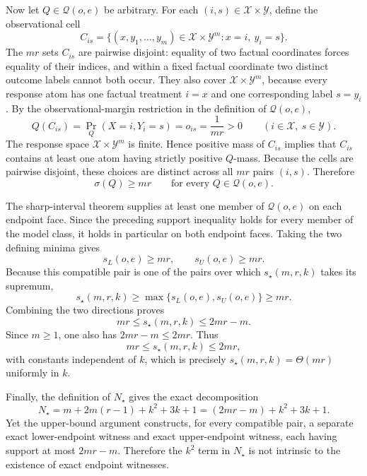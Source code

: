 Now let \(Q\in\mathcal Q(o,e)\) be arbitrary.  For each \((i,s)\in\mathcal X\times\mathcal Y\), define the observational cell
\[
 C_{is}
 =\{(x,y_1,\ldots,y_m)\in\mathcal X\times\mathcal Y^m:
       x=i,\ y_i=s\}.
\]
The \(mr\) sets \(C_{is}\) are pairwise disjoint: equality of two factual coordinates forces equality of their indices, and within a fixed factual coordinate two distinct outcome labels cannot both occur.  They also cover \(\mathcal X\times\mathcal Y^m\), because every response atom has one factual treatment \(i=x\) and one corresponding label \(s=y_i\).  By the observational-margin restriction in the definition of \(\mathcal Q(o,e)\),
\[
 Q(C_{is})
 =\Pr_Q(X=i,Y_i=s)
 =o_{is}
 =\frac1{mr}>0
 \qquad(i\in\mathcal X,\ s\in\mathcal Y).
\]
The response space \(\mathcal X\times\mathcal Y^m\) is finite.  Hence positive mass of \(C_{is}\) implies that \(C_{is}\) contains at least one atom having strictly positive \(Q\)-mass.  Because the cells are pairwise disjoint, these choices are distinct across all \(mr\) pairs \((i,s)\).  Therefore
\[
 \sigma(Q)\geq mr
 \qquad\text{for every }Q\in\mathcal Q(o,e).
\]

The sharp-interval theorem supplies at least one member of \(\mathcal Q(o,e)\) on each endpoint face.  Since the preceding support inequality holds for every member of the model class, it holds in particular on both endpoint faces.  Taking the two defining minima gives
\[
 s_L(o,e)\geq mr,
 \qquad
 s_U(o,e)\geq mr.
\]
Because this compatible pair is one of the pairs over which \(s_\star(m,r,k)\) takes its supremum,
\[
 s_\star(m,r,k)
 \geq\max\{s_L(o,e),s_U(o,e)\}
 \geq mr.
\]
Combining the two directions proves
\[
 mr\leq s_\star(m,r,k)\leq2mr-m.
\]
Since \(m\geq1\), one also has \(2mr-m\leq2mr\).  Thus
\[
 mr\leq s_\star(m,r,k)\leq2mr,
\]
with constants independent of \(k\), which is precisely \(s_\star(m,r,k)=\Theta(mr)\) uniformly in \(k\).

Finally, the definition of \(N_\star\) gives the exact decomposition
\[
 N_\star
 =m+2m(r-1)+k^2+3k+1
 =(2mr-m)+k^2+3k+1.
\]
Yet the upper-bound argument constructs, for every compatible pair, a separate exact lower-endpoint witness and exact upper-endpoint witness, each having support at most \(2mr-m\).  Therefore the \(k^2\) term in \(N_\star\) is not intrinsic to the existence of exact endpoint witnesses.
